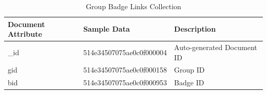 \begin{table}[H]
\caption{Group Badge Links Collection}\label{table:GroupBadgeLinksCollection}
\textbf{ }
\begin{center}
\begin{tabular}{ | l | l |  l | }
\hline
Document Attribute & Sample Data & Description \\ \hline
{\_}id & 514e34507075ae0c0f000004 & Auto-generated Document ID \\ \hline
gid & 514e34507075ae0c0f000158 & Group ID   \\ \hline
bid & 514e34507075ae0c0f000953 & Badge ID    \\ \hline
\end{tabular}
\end{center}
\end{table}

